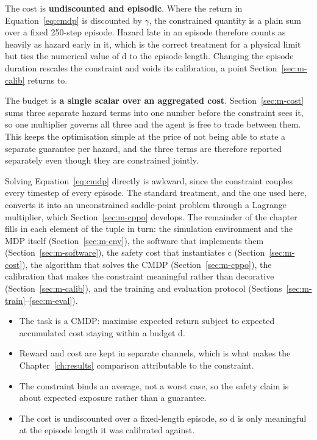The cost is \textbf{undiscounted and episodic}. Where the return in Equation~\ref{eq:cmdp} is
discounted by \(\gamma\), the constrained quantity is a plain sum over a fixed 250-step episode.
Hazard late in an episode therefore counts as heavily as hazard early in it, which is the correct
treatment for a physical limit but ties the numerical value of d to the episode length. Changing the
episode duration rescales the constraint and voids its calibration, a point Section~\ref{sec:m-calib}
returns to.

The budget is \textbf{a single scalar over an aggregated cost}. Section~\ref{sec:m-cost} sums three
separate hazard terms into one number before the constraint sees it, so one multiplier governs all
three and the agent is free to trade between them. This keeps the optimisation simple at the price
of not being able to state a separate guarantee per hazard, and the three terms are therefore
reported separately even though they are constrained jointly.

Solving Equation~\ref{eq:cmdp} directly is awkward, since the constraint couples every timestep of
every episode. The standard treatment, and the one used here, converts it into an unconstrained
saddle-point problem through a Lagrange multiplier, which Section~\ref{sec:m-cppo} develops. The
remainder of the chapter fills in each element of the tuple in turn: the simulation environment and
the MDP itself (Section~\ref{sec:m-env}), the software that implements them
(Section~\ref{sec:m-software}), the safety cost that instantiates c (Section~\ref{sec:m-cost}), the
algorithm that solves the CMDP (Section~\ref{sec:m-cppo}), the calibration that makes the constraint
meaningful rather than decorative (Section~\ref{sec:m-calib}), and the training and evaluation
protocol (Sections~\ref{sec:m-train}--\ref{sec:m-eval}).

\begin{keypoints}
\begin{itemize}\tightlist
\item The task is a CMDP: maximise expected return subject to expected accumulated cost staying
within a budget d.
\item Reward and cost are kept in separate channels, which is what makes the Chapter~\ref{ch:results}
comparison attributable to the constraint.
\item The constraint binds an average, not a worst case, so the safety claim is about expected
exposure rather than a guarantee.
\item The cost is undiscounted over a fixed-length episode, so d is only meaningful at the episode
length it was calibrated against.
\end{itemize}
\end{keypoints}

